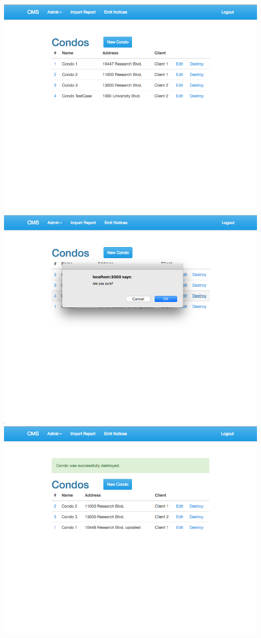 \begin{itemize}
    \includegraphics[scale=0.25]{./images/ss/condo/delete/2.png}\\
    \includegraphics[scale=0.25]{./images/ss/condo/delete/3.png}
    \includegraphics[scale=0.25]{./images/ss/condo/delete/4.png}
\end{itemize}
